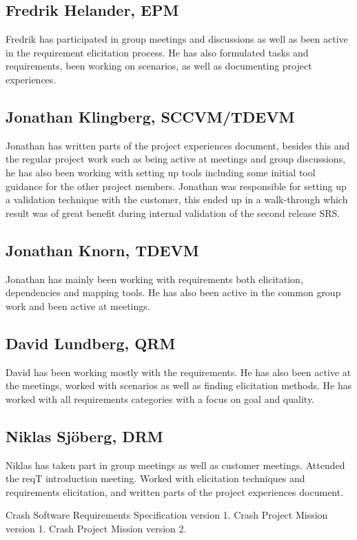 \documentclass[10pt]{article}
\begin{document}
\subsection{Fredrik Helander, EPM}
Fredrik has participated in group meetings and discussions as well as been active in the requirement elicitation process. He has also formulated tasks and requirements, been working on scenarios, as well as documenting project experiences.
\subsection{Jonathan Klingberg, SCCVM/TDEVM}
Jonathan has written parts of the project experiences document, besides this and the regular project work such as being active at meetings and group discussions, he has also been working with setting up tools including some initial tool guidance for the other project members.
Jonathan was responsible for setting up a validation technique with the customer, this ended up in a walk-through which result was of great benefit during internal validation of the second release SRS.
\subsection{Jonathan Knorn, TDEVM}
Jonathan has mainly been working with requirements both elicitation, dependencies and mapping tools. 
He has also been active in the common group work and been active at meetings.
\subsection{David Lundberg, QRM}
David has been working mostly with the requirements. He has also been active at the meetings, worked with scenarios as well as finding elicitation methods. He has worked with all requirements categories with a focus on goal and quality. 
\subsection{Niklas Sjöberg, DRM}
Niklas has taken part in group meetings as well as customer meetings. Attended the reqT introduction meeting. Worked with elicitation techniques and requirements elicitation, and written parts of the project experiences document. 

\newpage
\begin{thebibliography}{1}
 Crash Software Requirements Specification version 1. 
 Crash Project Mission version 1.
 Crash Project Mission version 2.
\end{thebibliography}
\newpage
\end{document}
